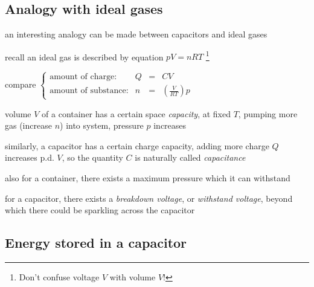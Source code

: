 \documentclass[a4paper,12pt]{book}
\newcounter{example}[chapter]
\renewcommand{\theexample}{\arabic{chapter}.\arabic{example}}
\newcommand{\example}[1]{%
	\refstepcounter{example}
	\noindent {\textcolor{cyan}{\textsf{\textbf{Example \theexample }}} \hspace*{1pt} #1 %
	} \vspace{5pt}}
\newenvironment{soln}
  {\centering
  	\vspace*{6pt}
  	\begin{tcolorbox}[colframe=Gray,colback=LightGreen!15]
  \setlength{\baselineskip}{\baselineskip}%
  }
  {\end{tcolorbox}\vspace*{-4pt}}
\newcommand{\eqyskip}{\vspace{4pt}}
\newcommand{\ec}{4\pi\epsilon_0}
\begin{document}





\subsection*{Analogy with ideal gases}

an interesting analogy can be made between capacitors and ideal gases

recall an ideal gas is described by equation $pV=nRT$
\footnote{Don't confuse voltage $V$ with volume $V$!}

compare $\left\{\begin{array}{lccl}
\text{amount of charge:} & Q & = &CV \\ \text{amount of substance:} &n & = & \left(\frac{V}{RT}\right) p
\end{array}\right.$

\eqyskip
volume $V$ of a container has a certain space \emph{capacity}, at fixed $T$, pumping more gas (increase $n$) into system, pressure $p$ increases

similarly, a capacitor has a certain charge capacity, adding more charge $Q$ increases p.d. $V$, so the quantity $C$ is naturally called \emph{capacitance}

also for a container, there exists a maximum pressure which it can withstand

for a capacitor, there exists a \emph{breakdown voltage}, or \emph{withstand voltage}, beyond which there could be sparkling across the capacitor

\subsection{Energy stored in a capacitor}
\end{document}
